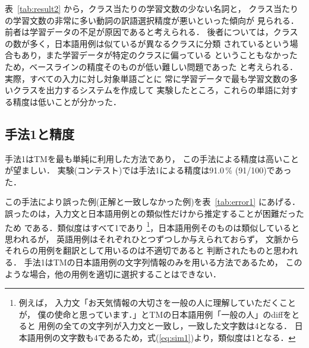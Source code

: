 表~\ref{tab:result2} から，クラス当たりの学習文数の少ない名詞と，
クラス当たりの学習文数の非常に多い動詞の訳語選択精度が悪いといった傾向が
見られる．前者は学習データの不足が原因であると考えられる．
後者については，クラスの数が多く，日本語用例は似ているが異なるクラスに分類
されているという場合もあり，また学習データが特定のクラスに偏っている
ということもなかったため，ベースラインの精度そのものが低い難しい問題であった
と考えられる．実際，すべての入力に対し対象単語ごとに
常に学習データで最も学習文数の多いクラスを出力するシステムを作成して
実験したところ，これらの単語に対する精度は低いことが分かった．

\subsection{手法1と精度}
\label{sec:method1_and_acc}

手法1はTMを最も単純に利用した方法であり，
この手法による精度は高いことが望ましい．
実験(コンテスト)では手法1による精度は91.0\,\% (91/100)であった．

この手法により誤った例(正解と一致しなかった例)を表~\ref{tab:error1} にあげる．
誤ったのは，入力文と日本語用例との類似性だけから推定することが困難だったため
である．類似度はすべて1であり
\footnote{例えば，
入力文「お天気情報の大切さを一般の人に理解していただくことが，
僕の使命と思っています．」とTMの日本語用例「一般の人」のdiffをとると
用例の全ての文字列が入力文と一致し，一致した文字数は4となる．
日本語用例の文字数も4であるため，式(\ref{eq:sim1})より，類似度は1となる．
}，日本語用例そのものは類似していると思われるが，
英語用例はそれぞれひとつずつしか与えられておらず，
文脈からそれらの用例を翻訳として用いるのは不適切であると
判断されたものと思われる．
手法1はTMの日本語用例の文字列情報のみを用いる方法であるため，
このような場合，他の用例を適切に選択することはできない．

